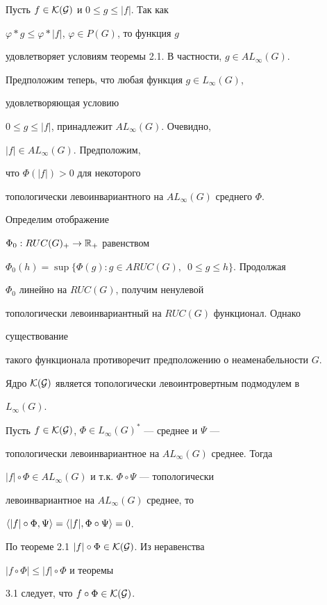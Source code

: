 \begin{pf}


Пусть $f\in\cal K(G)$ и $0\le g\le |f|$. Так как


$\varphi\ast g\le\varphi\ast |f|$, $\varphi\in P(G)$, то функция $g$


удовлетворяет условиям теоремы 2.1. В частности, $g\in AL_\infty(G)$.





Предположим теперь, что любая функция $g\in L_\infty(G)$,


удовлетворяющая условию


$0\le g\le |f|$, принадлежит $AL_\infty(G)$. Очевидно,


$|f|\in AL_\infty(G)$. Предположим,


что $\Phi(|f|)>0$ для некоторого


топологически левоинвариантного на $AL_\infty(G)$ среднего $\Phi$.


Определим отображение


$\Phi_0:RUC(G)_+\to\Bbb R_+$ равенством


$\Phi_0(h)=\sup\{\Phi(g):g\in ARUC(G),\ \; 0\le g\le h\}$. Продолжая


$\Phi_0$ линейно на $RUC(G)$, получим ненулевой


топологически левоинвариантный на $RUC(G)$ функционал. Однако


существование


такого функционала противоречит предположению о неаменабельности $G$.


\end{pf}





\begin{thms}


Ядро $\cal K(G)$ является топологически левоинтровертным подмодулем в


$L_\infty(G)$.


\end{thms}





\begin{pf}


Пусть $f\in\cal K(G)$, $\Phi\in L_\infty(G)^*$ --- среднее и $\Psi$ ---


топологически левоинвариантное на $AL_\infty(G)$ среднее. Тогда


$|f|\circ\Phi\in AL_\infty(G)$ и т.к. $\Phi\circ\Psi$ --- топологически


левоинвариантное на $AL_\infty(G)$ среднее, то


$\langle |f|\circ\Phi,\Psi\rangle=\langle |f|,\Phi\circ\Psi\rangle=0$.


По теореме 2.1\; $|f|\circ\Phi\in\cal K(G)$. Из неравенства


$|f\circ\Phi|\le |f|\circ\Phi$ и теоремы


3.1 следует, что $f\circ\Phi\in\cal K(G)$.


\end{pf}





